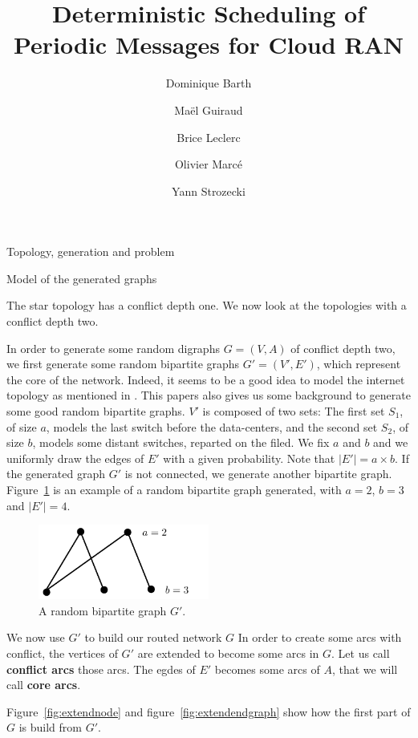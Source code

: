 \documentclass[10pt]{article}
\title{Deterministic Scheduling of Periodic Messages for Cloud RAN}
\author[1]{Dominique Barth}
\author[1,2]{Ma\"el Guiraud}
\author[2]{Brice Leclerc}
\author[2]{Olivier Marc\'e}
\author[1]{Yann Strozecki}
\affil[1]{David Laboratory, UVSQ}
\affil[2]{Nokia Bell Labs France}
\begin{document}
\begin{section}{Topology, generation and problem}
\begin{subsection}{Model of the generated graphs}


The star topology has a conflict depth one. We now look at the topologies with a conflict depth two.
  
In order to generate some random digraphs $G=(V,A)$ of conflict depth two, we first generate some random bipartite graphs $G'=(V',E')$, which represent the core of the network. Indeed, it seems to be a good idea to model the internet topology as mentioned in \cite{tarissan_towards_2013}. This papers also gives us some background to generate some good random bipartite graphs. 
$V'$ is composed of two sets: The first set $S_1$, of size $a$, models the last switch before the data-centers, and the second set $S_2$, of size $b$, models some distant switches, reparted on the filed. We fix $a$ and $b$ and we uniformly draw the edges of $E'$ with a given probability. Note that $|E'|= a \times b$. If the generated graph  $G'$ is not connected, we generate another bipartite graph.
Figure~\ref{fig:random23} is an example of a random bipartite graph generated, with $a = 2$, $b=3$ and $|E'|=4$.

\begin{figure}[h]
\begin{center}
\includegraphics[width=0.5\textwidth]{random23}
\caption{A random bipartite graph $G'$.}\label{fig:random23}
\end{center}
\end{figure}


We now use $G'$ to build our routed network $G$
In order to create some arcs with conflict, the vertices of $G'$ are extended to become some arcs in $G$. Let us call \textbf{conflict arcs} those arcs. The egdes of $E'$ becomes some arcs of $A$, that we will call \textbf{core arcs}.

Figure~\ref{fig:extendnode} and figure~\ref{fig:extendendgraph} show how the first part of $G$ is build from $G'$.
\begin{minipage}{.5\linewidth}


\end{minipage}
\end{subsection}
\end{section}
\end{document}
